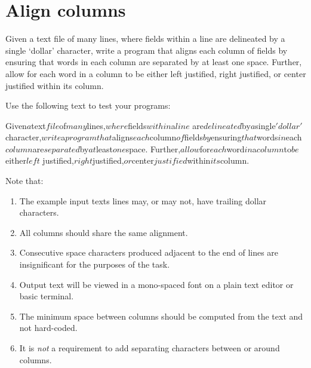 \pagebreak{}
\section*{Align columns}

Given a text file of many lines, where fields within a line are
delineated by a single `dollar' character, write a program that aligns
each column of fields by ensuring that words in each column are
separated by at least one space. Further, allow for each word in a
column to be either left justified, right justified, or center
justified within its column.

Use the following text to test your programs:

\begin{wideverbatim}
Given$a$text$file$of$many$lines,$where$fields$within$a$line$
are$delineated$by$a$single$'dollar'$character,$write$a$program
that$aligns$each$column$of$fields$by$ensuring$that$words$in$each$
column$are$separated$by$at$least$one$space.
Further,$allow$for$each$word$in$a$column$to$be$either$left$
justified,$right$justified,$or$center$justified$within$its$column.
\end{wideverbatim}

Note that:

\begin{enumerate}
\item
  The example input texts lines may, or may not, have trailing dollar
  characters.
\item
  All columns should share the same alignment.
\item
  Consecutive space characters produced adjacent to the end of lines are
  insignificant for the purposes of the task.
\item
  Output text will be viewed in a mono-spaced font on a plain text
  editor or basic terminal.
\item
  The minimum space between columns should be computed from the text and
  not hard-coded.
\item
  It is \emph{not} a requirement to add separating characters between or
  around columns.
\end{enumerate}



